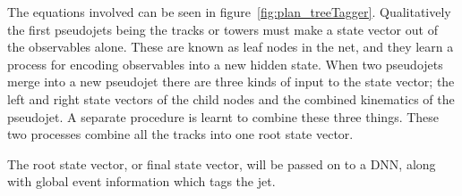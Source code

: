The equations involved can be seen in figure~\ref{fig:plan_treeTagger}.
Qualitatively the first pseudojets being the tracks or towers must make a state vector out of the observables alone.
These are known as leaf nodes in the net, and they learn a process for encoding observables into a new hidden state.
When two pseudojets merge into a new pseudojet there are three kinds of input to the state vector;
the left and right state vectors of the child nodes and the combined kinematics of the pseudojet.
A separate procedure is learnt to combine these three things.
These two processes combine all the tracks into one root state vector.

The root state vector, or final state vector, will be passed on to a DNN,
along with global event information which tags the jet.



